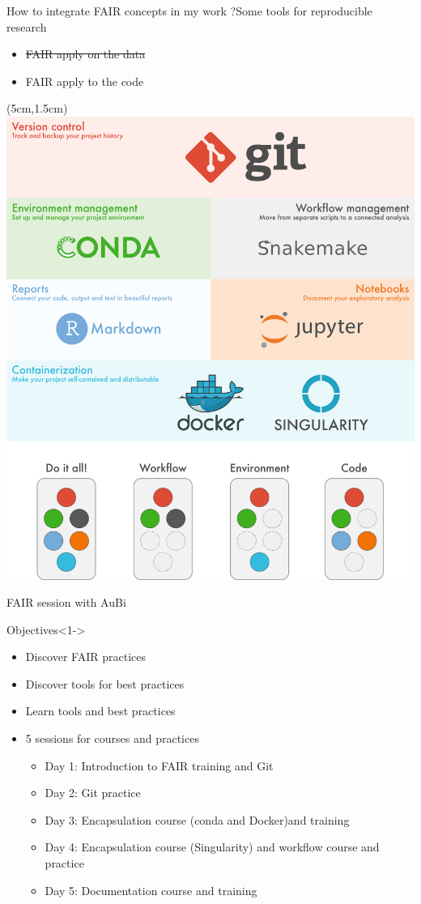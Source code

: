 \begin{frame}{How to integrate FAIR concepts in my work ?}{Some tools for reproducible research}
\begin{itemize}
\item {\sout{\color{gray} FAIR apply on the data}}
\item FAIR apply to the code
\end{itemize}
\begin{textblock*}{15cm}(5cm,1.5cm) %
\includegraphics[scale=0.3]{images/tutorials_overview.png}
\end{textblock*}
\end{frame}

\begin{frame}{FAIR session with AuBi}
\begin{block}{Objectives}<1->
\begin{itemize}
\item Discover FAIR practices
\item Discover tools for best practices
\item Learn tools and best practices
\item<2-> 5 sessions for courses and practices
	\begin{itemize}[<2->]
	\item Day 1: Introduction to FAIR training and Git
	\item Day 2: Git practice
	\item Day 3: Encapsulation course (conda and Docker)and training
	\item Day 4: Encapsulation course (Singularity) and workflow course and practice
	\item Day 5: Documentation course and training
	\end{itemize}
\end{itemize}
\end{block}
\end{frame}

